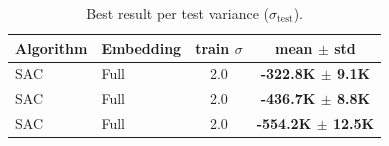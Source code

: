 \begin{table}[t]\centering
\caption{Best result per test variance ($\sigma_{\text{test}}$).}\label{tab:best}
\begin{tabular}{l l c c}
\toprule
Algorithm & Embedding & train $\sigma$ & mean $\pm$ std \\
\midrule
SAC & Full & 2.0 & \textbf{-322.8K $\pm$ 9.1K} \\
SAC & Full & 2.0 & \textbf{-436.7K $\pm$ 8.8K} \\
SAC & Full & 2.0 & \textbf{-554.2K $\pm$ 12.5K} \\
\bottomrule
\end{tabular}
\end{table}